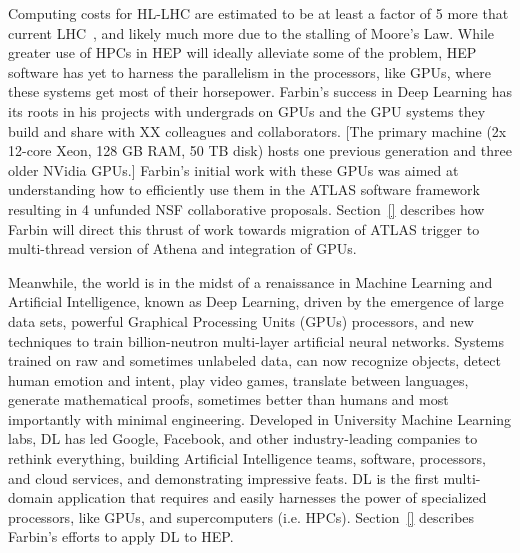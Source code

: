 Computing costs for HL-LHC are estimated to be at least a factor of 5
more that current LHC~\cite{}, and likely much more due to the
stalling of Moore's Law. While greater use of HPCs in HEP will ideally
alleviate some of the problem, HEP software has yet to harness the
parallelism in the processors, like GPUs, where these systems get most
of their horsepower. Farbin's success in Deep Learning has its roots
in his projects with undergrads on GPUs and the GPU systems they build
and share with XX colleagues and collaborators. [The primary machine
  (2x 12-core Xeon, 128 GB RAM, 50 TB disk) hosts one previous
  generation and three older NVidia GPUs.] Farbin's initial work with
these GPUs was aimed at understanding how to efficiently use them in
the ATLAS software framework resulting in 4 unfunded NSF collaborative
proposals. Section~\ref{} describes how Farbin will direct this thrust
of work towards migration of ATLAS trigger to multi-thread version of
Athena and integration of GPUs. 

Meanwhile, the world is in the midst of a renaissance in Machine
Learning and Artificial Intelligence, known as Deep Learning, driven
by the emergence of large data sets, powerful Graphical Processing
Units (GPUs) processors, and new techniques to train billion-neutron
multi-layer artificial neural networks. Systems trained on raw and
sometimes unlabeled data, can now recognize objects, detect human
emotion and intent, play video games, translate between languages,
generate mathematical proofs, sometimes better than humans and most
importantly with minimal engineering. Developed in University Machine
Learning labs, DL has led Google, Facebook, and other industry-leading
companies to rethink everything, building Artificial Intelligence
teams, software, processors, and cloud services, and demonstrating
impressive feats. DL is the first multi-domain application that
requires and easily harnesses the power of specialized processors,
like GPUs, and supercomputers (i.e. HPCs). Section~\ref{} describes
Farbin's efforts to apply DL to HEP.
